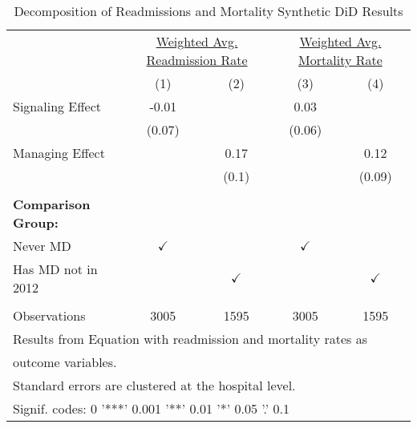 \begin{table}[ht!]

\caption{\label{tab:MD_noMD_readmort_decomp_synth}Decomposition of Readmissions and Mortality Synthetic DiD Results}
\centering
\begin{tabular}[t]{lcccc}
\toprule
\multicolumn{1}{c}{ } & \multicolumn{2}{c}{\underline{Weighted Avg. Readmission Rate}} & \multicolumn{2}{c}{\underline{Weighted Avg. Mortality Rate}} \\
 & (1) & (2) & (3) & (4)\\
\midrule
Signaling Effect & -0.01 &  & 0.03 & \\
 & (0.07) &  & (0.06) & \\
Managing Effect &  & 0.17 &  & 0.12\\
 &  & (0.1) &  & (0.09)\\
 &  &  &  & \\
\addlinespace
\textbf{Comparison Group:} &  &  &  & \\
Never MD & $\checkmark$ &  & $\checkmark$ & \\
Has MD not in 2012 &  & $\checkmark$ &  & $\checkmark$\\
 &  &  &  & \\
Observations & 3005 & 1595 & 3005 & 1595\\
\bottomrule
\multicolumn{5}{l}{\textsuperscript{} Results from Equation with readmission and mortality rates as}\\
\multicolumn{5}{l}{outcome variables.}\\
\multicolumn{5}{l}{\textsuperscript{} Standard errors are clustered at the hospital level.}\\
\multicolumn{5}{l}{\textsuperscript{} Signif. codes: 0 '***' 0.001 '**' 0.01 '*' 0.05 '.' 0.1}\\
\end{tabular}
\end{table}

